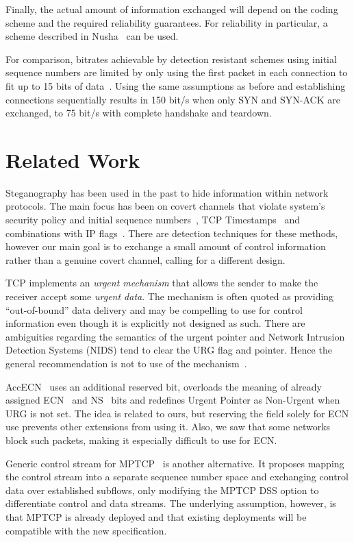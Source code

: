 \documentclass{sig-alternate-10pt}
\begin{document}
Finally, the actual amount of information exchanged will depend on the coding scheme and the required reliability guarantees. For reliability in particular, a scheme described in Nusha~\cite{Rutkowska:2004ul} can be used.

For comparison, bitrates achievable by detection resistant schemes using initial sequence numbers are limited by only using the first packet in each connection to fit up to 15 bits of data~\cite{Murdoch:2005fz}. Using the same assumptions as before and establishing connections sequentially results in 150 bit/s when only SYN and SYN-ACK are exchanged, to 75 bit/s with complete handshake and teardown. 

\section{Related Work}
\label{sec:related}

Steganography has been used in the past to hide information within network protocols. The main focus has been on covert channels that violate system's security policy and initial sequence numbers~\cite{Rowland:1997vq}, TCP Timestamps~\cite{Giffin:2002wh} and combinations with IP flags~\cite{Murdoch:2005fz}. There are detection techniques for these methods, however our main goal is to exchange a small amount of control information rather than a genuine covert channel, calling for a different design.

TCP implements an \emph{urgent mechanism} that allows the sender to make the receiver accept some \emph{urgent data}. The mechanism is often quoted as providing ``out-of-bound'' data delivery and may be compelling to use for control information even though it is explicitly not designed as such. There are ambiguities regarding the semantics of the urgent pointer and Network Intrusion Detection Systems (NIDS) tend to clear the URG flag and pointer. Hence the general recommendation is not to use of the mechanism~\cite{Gont:2011vi}.

AccECN~\cite{Kuhlewind:2014vd} uses an additional reserved bit, overloads the meaning of already assigned ECN~\cite{Floyd:up} and NS~\cite{Ely:uc} bits and redefines Urgent Pointer as Non-Urgent when URG is not set. The idea is related to ours, but reserving the field solely for ECN use prevents other extensions from using it. Also, we saw that some networks block such packets, making it especially difficult to use for ECN.

Generic control stream for MPTCP~\cite{Bonaventure:wx} is another alternative. It proposes mapping the control stream into a separate sequence number space and exchanging control data over established subflows, only modifying the MPTCP DSS option to differentiate control and data streams. The underlying assumption, however, is that MPTCP is already deployed and that existing deployments will be compatible with the new specification.
\end{document}

